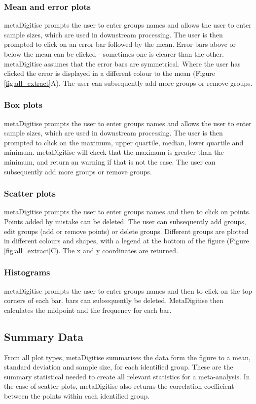 \documentclass{article}
\begin{document}
\subsubsection{Mean and error plots} 
metaDigitise prompts the user to enter groups names and allows the user to enter sample sizes, which are used in downstream processing. The user is then prompted to click on an error bar followed by the mean. Error bars above or below the mean can be clicked - sometimes one is clearer than the other. metaDigitise assumes that the error bars are symmetrical. Where the user has clicked the error is displayed in a different colour to the mean (Figure \ref{fig:all_extract}A). The user can subsequently add more groups or remove groups.


\subsubsection{Box plots}
 metaDigitise prompts the user to enter groups names and allows the user to enter sample sizes, which are used in downstream processing. The user is then prompted to click on the maximum, upper quartile, median, lower quartile and minimum. metaDigitise will check that the maximum is greater than the minimum, and return an warning if that is not the case. The user can subsequently add more groups or remove groups.

\subsubsection{Scatter plots}
 metaDigitise prompts the user to enter groups names and then to click on points. Points added by mistake can be deleted. The user can subsequently add groups, edit groups (add or remove points) or delete groups. Different groups are plotted in different colours and shapes, with a legend at the bottom of the figure (Figure \ref{fig:all_extract}C). The x and y coordinates are returned.


\subsubsection{Histograms}
metaDigitise prompts the user to enter groups names and then to click on the top corners of each bar. bars can subsequently be deleted. MetaDigitise then calculates the midpoint and the frequency for each bar. 


\subsection{Summary Data}
From all plot types, metaDigitise summarises the data form the figure to a mean, standard deviation and sample size, for each identified group. These are the summary statistical needed to create all relevant statistics for a meta-analysis. In the case of scatter plots, metaDigitise also returns the correlation coefficient between the points within each identified group. 
\end{document}
